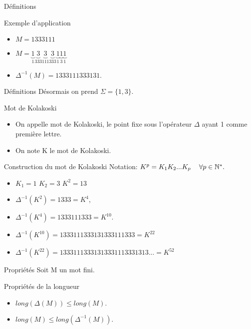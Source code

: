 \documentclass[12pt]{beamer}
\begin{document}
\begin{frame}[t]{Définitions}
  \begin{block}{Exemple d'application}
    \begin{itemize}
    \item  $M=1333111$
    \item $M=\underset{1}{\underbrace{1}} 
            \underset{333}{\underbrace{3}} 
            \underset{111}{\underbrace{3}} 
            \underset{333}{\underbrace{3}} 
            \underset{1}{\underbrace{1}}
            \underset{3}{\underbrace{1}}
            \underset{1}{\underbrace{1}}$
    \item<alert@1->
    $\Delta^{-1}(M)= 1333111333131$.
  \end{itemize}
  \end{block}
\end{frame}
\begin{frame}[t]{Définitions}
Désormais on prend $\Sigma = \{ 1,3 \}$.
  \begin{block}{Mot de Kolakoski}  
    \begin{itemize}
    \item On appelle mot de Kolakoski, le point fixe sous l'opérateur $\Delta$ ayant 1 comme première lettre.
    \item<alert@1->
     On note K le mot de Kolakoski.
    \end{itemize}
  \end{block}
\end{frame}
\begin{frame}[t]{Construction du mot de Kolakoski}
 Notation: $K^p=K_1K_2...K_p \hspace{1\baselineskip} \forall p \in \mathbb{N}^*.$ \\
    \begin{itemize}
    \item $K_1=1$ \Rightarrow $K_2=3$ \Rightarrow $K^2=13$ 
    \item $\Delta^{-1}(K^2)=1333=K^4$, 
    \item   
$\Delta^{-1}(K^4)=1333111333=K^{10}$.
    \item $\Delta^{-1}(K^{10})=1333111333131333111333=K^{22}$
    \item $\Delta^{-1}(K^{22})=13331113331313331113331313...=K^{52}$
    \end{itemize}
\end{frame}
\begin{frame}[t]{Propriétés}
Soit M un mot fini.
 \begin{block}{Propriétés de la longueur}
    \begin{itemize}
\item  $long(\Delta(M))\leq long(M).$
\item  $long(M) \leq long(\Delta^{-1}(M)).$
    \end{itemize}
  \end{block}
\end{frame}
\end{document}
